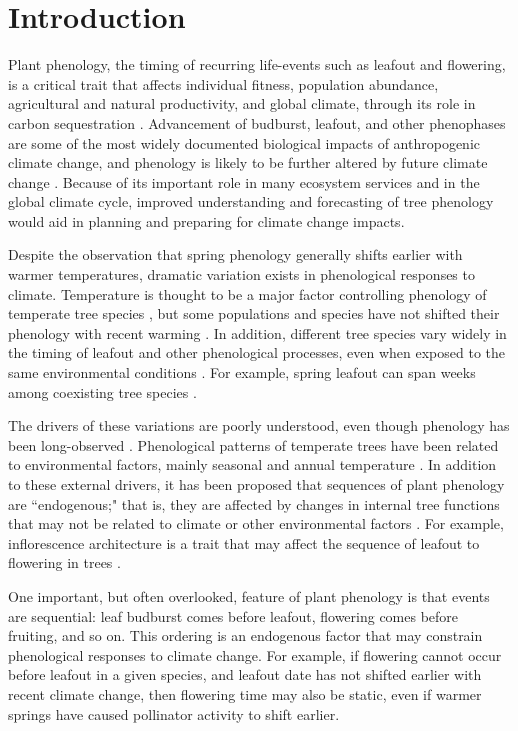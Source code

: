 \documentclass{article}
\begin{document}
\section* {Introduction}
Plant phenology, the timing of recurring life-events such as leafout and flowering, is a critical trait that affects individual fitness, population abundance, agricultural and natural productivity, and global climate, through its role in carbon sequestration \citep{chuine2001,cleland2007,willis2010,miller-rushing2010,craine2012}. Advancement of budburst, leafout, and other phenophases are some of the most widely documented biological impacts of anthropogenic climate change, and phenology is likely to be further altered by future climate change \citep{parmesan2006}. Because of its important role in many ecosystem services and in the global climate cycle, improved understanding and forecasting of tree phenology would aid in planning and preparing for climate change impacts.
\par Despite the observation that spring phenology generally shifts earlier with warmer temperatures, dramatic variation exists in phenological responses to climate. Temperature is thought to be a major factor controlling phenology of temperate tree species \citep{parmesan2006, morin2010,schwartz2013}, but some populations and species have not shifted their phenology with recent warming \citep{wolkovich2012}. In addition, different tree species vary widely in the timing of leafout and other phenological processes, even when exposed to the same environmental conditions \citep{lechowicz1984,primack2009c}. For example, spring leafout can span weeks among coexisting tree species \citep{lechowicz1984}. 
\par The drivers of these variations are poorly understood, even though phenology has been long-observed \citep{wolkovich2014}. Phenological patterns of temperate trees have been related to environmental factors, mainly seasonal and annual temperature  \citep[e.g.][]{richardson2006,clark2014b}. In addition to these external drivers, it has been proposed that sequences of plant  phenology are  ``endogenous;"  that is, they are affected by changes in internal tree functions that may not be related to climate or other environmental factors \citep{borchert1992,marco2002}. For example, inflorescence architecture  is  a trait that  may affect the sequence of leafout to  flowering in trees \citep{marco2002}. 

\par One important, but often overlooked, feature of plant phenology is that events are sequential: leaf budburst comes before leafout, flowering comes before fruiting, and so on. This ordering is an endogenous factor that may constrain phenological responses to climate change. For example, if flowering cannot occur before leafout in a given species, and leafout date has not shifted earlier with recent climate change, then flowering time may also be static, even if warmer springs have caused pollinator activity to shift earlier. 
\end{document}
